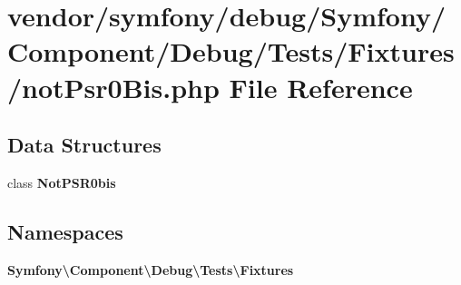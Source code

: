 \section{vendor/symfony/debug/\+Symfony/\+Component/\+Debug/\+Tests/\+Fixtures/not\+Psr0\+Bis.php File Reference}
\label{not_psr0_bis_8php}
\subsection*{Data Structures}
\begin{DoxyCompactItemize}
\item 
class {\bf Not\+P\+S\+R0bis}
\end{DoxyCompactItemize}
\subsection*{Namespaces}
\begin{DoxyCompactItemize}
\item 
 {\bf Symfony\textbackslash{}\+Component\textbackslash{}\+Debug\textbackslash{}\+Tests\textbackslash{}\+Fixtures}
\end{DoxyCompactItemize}
